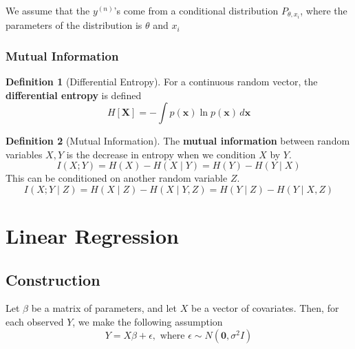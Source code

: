 \documentclass{article}
\theoremstyle{definition}
\newtheorem{definition}{Definition}[section]
\begin{document}
    We assume that the $y^{(n)}$'s come from a conditional distribution $P_{\theta, x_i}$, where the parameters of the distribution is $\theta$ and $x_i$ 


    \subsubsection{Mutual Information}

    \begin{definition}[Differential Entropy]
    For a continuous random vector, the \textbf{differential entropy} is defined 
    \[H[\mathbf{X}] = - \int p(\mathbf{x}) \ln{p(\mathbf{x})} \,d\mathbf{x}\]
    \end{definition}

    \begin{definition}[Mutual Information]
    The \textbf{mutual information} between random variables $X, Y$ is the decrease in entropy when we condition $X$ by $Y$. 
    \[I(X ; Y) = H(X) - H(X \mid Y) = H(Y) - H(Y \mid X)\]
    This can be conditioned on another random variable $Z$. 
    \[I(X ; Y \mid Z) = H(X \mid Z) - H(X \mid Y, Z) = H(Y \mid Z) - H(Y \mid X, Z)\]
    \end{definition}

\section{Linear Regression}

  \subsection{Construction}

  Let $\beta$ be a matrix of parameters, and let $X$ be a vector of covariates. Then, for each observed $Y$, we make the following assumption 
  \[Y = X \beta + \epsilon, \text{ where } \epsilon \sim N(\mathbf{0}, \sigma^2 I)\]
\end{document}
